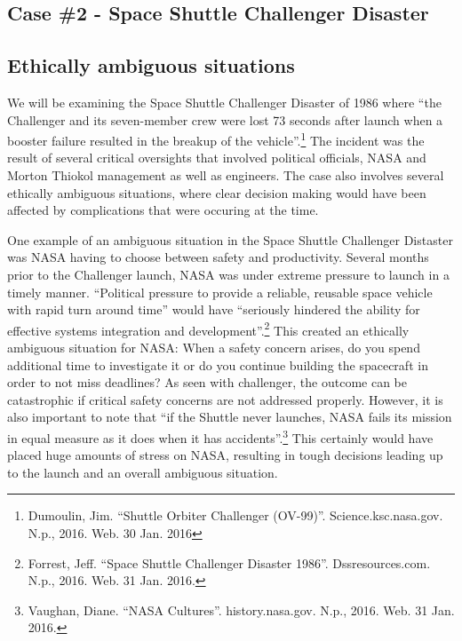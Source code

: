 \documentclass{article}
\newcommand{\q}[1]{``#1''}
\begin{document}
\begin{center}\section*{Case \#2 - Space Shuttle Challenger Disaster}\end{center}

\subsection{Ethically ambiguous situations} 

We will be examining the Space Shuttle Challenger Disaster of 1986 where \q{the Challenger and its seven-member crew were lost 73 seconds after launch when a booster failure resulted in the breakup of the vehicle}.\footnote{Dumoulin, Jim. \q{Shuttle Orbiter Challenger (OV-99)}. Science.ksc.nasa.gov. N.p., 2016. Web. 30 Jan. 2016} The incident was the result of several critical oversights that involved political officials, NASA and Morton Thiokol management as well as engineers. The case also involves several ethically ambiguous situations, where clear decision making would have been affected by complications that were occuring at the time. \par 

One example of an ambiguous situation in the Space Shuttle Challenger Distaster was NASA having to choose between safety and productivity. Several months prior to the Challenger launch, NASA was under extreme pressure to launch in a timely manner. \q{Political pressure to provide a reliable, reusable space vehicle with rapid turn around time} would have \q{seriously hindered the ability for effective systems integration and development}.\footnote{Forrest, Jeff. \q{Space Shuttle Challenger Disaster 1986}. Dssresources.com. N.p., 2016. Web. 31 Jan. 2016.} This created an ethically ambiguous situation for NASA: When a safety concern arises, do you spend additional time to investigate it or do you continue building the spacecraft in order to not miss deadlines? As seen with challenger, the outcome can be catastrophic if critical safety concerns are not addressed properly. However, it is also important to note that \q{if the Shuttle never launches, NASA fails its mission in equal measure as it does when it has accidents}.\footnote{Vaughan, Diane. \q{NASA Cultures}. history.nasa.gov. N.p., 2016. Web. 31 Jan. 2016.} This certainly would have placed huge amounts of stress on NASA, resulting in tough decisions leading up to the launch and an overall ambiguous situation. \par
\end{document}
